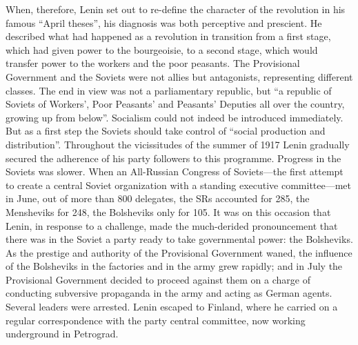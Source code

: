 When, therefore, Lenin set out to re-define the character of the revolution in his famous ``April theses'', his diagnosis was both perceptive and prescient. He described what had happened as a revolution in transition from a first stage, which had given power to the bourgeoisie, to a second stage, which would transfer power to the workers and the poor peasants. The Provisional Government and the Soviets were not allies but antagonists, representing different classes. The end in view was not a parliamentary republic, but ``a republic of Soviets of Workers', Poor Peasants' and Peasants' Deputies all over the country, growing up from below''. Socialism could not indeed be introduced immediately. But as a first step the Soviets should take control of ``social production and distribution''. Throughout the vicissitudes of the summer of 1917 Lenin gradually secured the adherence of his party followers to this programme. Progress in the Soviets was slower. When an All-Russian Congress of Soviets---the first attempt to create a central Soviet organization with a standing executive committee---met in June, out of more than 800 delegates, the SRs accounted for 285, the Mensheviks for 248, the Bolsheviks only for 105. It was on this occasion that Lenin, in response to a challenge, made the much-derided pronouncement that there was in the Soviet a party ready to take governmental power: the Bolsheviks. As the prestige and authority of the Provisional Government waned, the influence of the Bolsheviks in the factories and in the army grew rapidly; and in July the Provisional Government decided to proceed against them on a charge of conducting subversive propaganda in the army and acting as German agents. Several leaders were arrested. Lenin escaped to Finland, where he carried on a regular correspondence with the party central committee, now working underground in Petrograd. 

